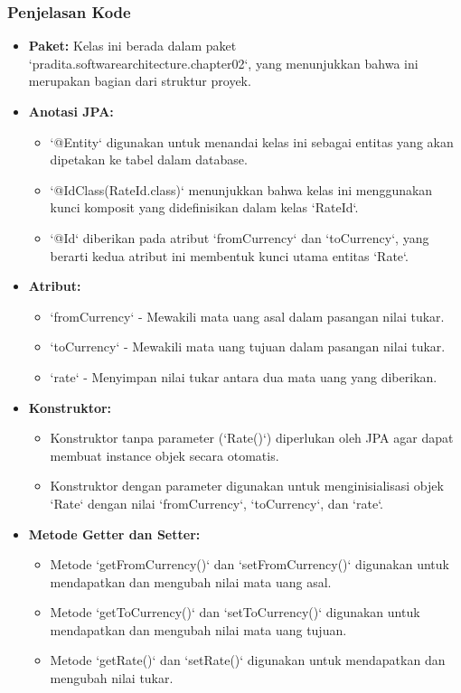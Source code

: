 \subsubsection{Penjelasan Kode}
\begin{itemize}
\item \textbf{Paket:} Kelas ini berada dalam paket `pradita.softwarearchitecture.chapter02`, yang menunjukkan bahwa ini merupakan bagian dari struktur proyek.
\item \textbf{Anotasi JPA:}
\begin{itemize}
\item `@Entity` digunakan untuk menandai kelas ini sebagai entitas yang akan dipetakan ke tabel dalam database.
\item `@IdClass(RateId.class)` menunjukkan bahwa kelas ini menggunakan kunci komposit yang didefinisikan dalam kelas `RateId`.
\item `@Id` diberikan pada atribut `fromCurrency` dan `toCurrency`, yang berarti kedua atribut ini membentuk kunci utama entitas `Rate`.
\end{itemize}
\item \textbf{Atribut:}
\begin{itemize}
\item `fromCurrency` - Mewakili mata uang asal dalam pasangan nilai tukar.
\item `toCurrency` - Mewakili mata uang tujuan dalam pasangan nilai tukar.
\item `rate` - Menyimpan nilai tukar antara dua mata uang yang diberikan.
\end{itemize}
\item \textbf{Konstruktor:}
\begin{itemize}
\item Konstruktor tanpa parameter (`Rate()`) diperlukan oleh JPA agar dapat membuat instance objek secara otomatis.
\item Konstruktor dengan parameter digunakan untuk menginisialisasi objek `Rate` dengan nilai `fromCurrency`, `toCurrency`, dan `rate`.
\end{itemize}
\item \textbf{Metode Getter dan Setter:}
\begin{itemize}
\item Metode `getFromCurrency()` dan `setFromCurrency()` digunakan untuk mendapatkan dan mengubah nilai mata uang asal.
\item Metode `getToCurrency()` dan `setToCurrency()` digunakan untuk mendapatkan dan mengubah nilai mata uang tujuan.
\item Metode `getRate()` dan `setRate()` digunakan untuk mendapatkan dan mengubah nilai tukar.
\end{itemize}
\end{itemize}

